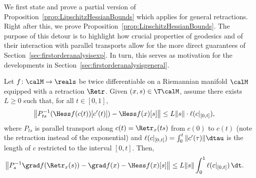 
We first state and prove a partial version of Proposition~\ref{prop:LipschitzHessianBounds} which applies for general retractions. Right after this, we prove Proposition~\ref{prop:LipschitzHessianBounds}. The purpose of this detour is to highlight how crucial properties of geodesics and of their interaction with parallel transports allow for the more direct guarantees of Section~\ref{sec:firstorderanalysisexp}. In turn, this serves as motivation for the developments in Section~\ref{sec:firstorderanalysisgeneral}.
\begin{proposition} \label{prop:LipschitzHessianBoundsretraction}
	Let $f \colon \calM \to \reals$ be twice differentiable on a Riemannian manifold $\calM$ equipped with a retraction $\Retr$. Given $(x, s) \in \T\calM$, assume there exists $L \geq 0$ such that, for all $t \in [0, 1]$,
	\begin{align*}
		\left\| P_{t s}^{-1}\!\left(\Hess f(c(t))[c'(t)]\right) - \Hess f(x)[s] \right\| & \leq L \|s\| \cdot \ell(c|_{[0, t]}),
	\end{align*}
	where $P_{ts}$ is parallel transport along $c(t) = \Retr_x(ts)$ from $c(0)$ to $c(t)$ (note the retraction instead of the exponential) %
	and $\ell(c|_{[0, t]}) = \int_{0}^{t} \|c'(\tau)\| \dtau$ is the length of $c$ restricted to the interval $[0, t]$. Then,
	\begin{align*}
		\left\| P_{s}^{-1}\grad f(\Retr_x(s)) - \grad f(x) - \Hess f(x)[s] \right\| & \leq L \|s\| \int_{0}^{1} \ell(c|_{[0, t]}) \,\dt.
	\end{align*}	
\end{proposition}

